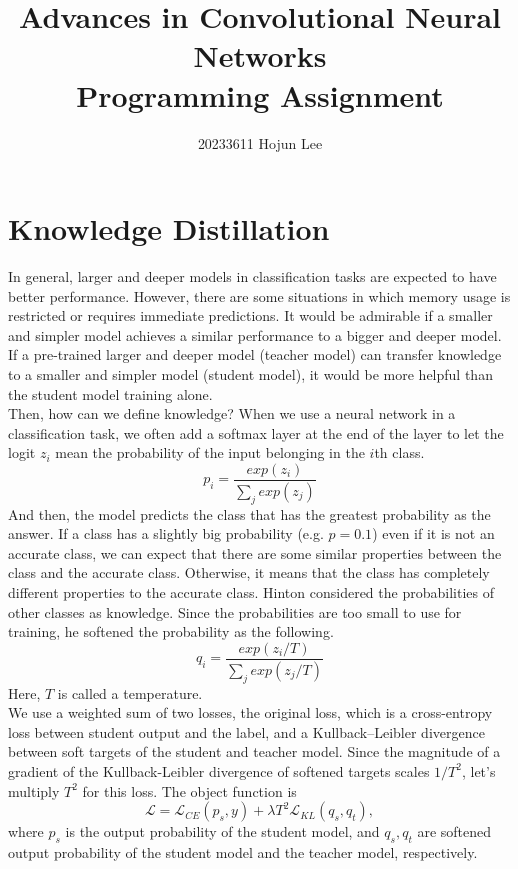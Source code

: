 \documentclass{article}
\title{Advances in Convolutional Neural Networks\\Programming Assignment}
\author{20233611 Hojun Lee}
\begin{document}
\maketitle

\section{Knowledge Distillation}
In general, larger and deeper models in classification tasks are expected to have better performance. However, there are some situations in which memory usage is restricted or requires immediate predictions. It would be admirable if a smaller and simpler model achieves a similar performance to a bigger and deeper model. If a pre-trained larger and deeper model (teacher model) can transfer knowledge to a smaller and simpler model (student model), it would be more helpful than the student model training alone.\\

Then, how can we define knowledge? When we use a neural network in a classification task, we often add a softmax layer at the end of the layer to let the logit $z_i$ mean the probability of the input belonging in the $i$th class.
\begin{equation}
    p_i=\frac{exp(z_i)}{\sum\limits_jexp(z_j)}
\end{equation}
And then, the model predicts the class that has the greatest probability as the answer. If a class has a slightly big probability (e.g. $p=0.1$) even if it is not an accurate class, we can expect that there are some similar properties between the class and the accurate class. Otherwise, it means that the class has completely different properties to the accurate class. Hinton considered the probabilities of other classes as knowledge. \cite{hinton2015distilling} Since the probabilities are too small to use for training, he softened the probability as the following.
\begin{equation}
    q_i=\frac{exp(z_i/T)}{\sum\limits_jexp(z_j/T)}
\end{equation}
Here, $T$ is called a temperature.\\

We use a weighted sum of two losses, the original loss, which is a cross-entropy loss between student output and the label, and a Kullback–Leibler divergence between soft targets of the student and teacher model. Since the magnitude of a gradient of the Kullback-Leibler divergence of softened targets scales $1/T^2$, let's multiply $T^2$ for this loss. The object function is 
\begin{equation}
    \mathcal{L}=\mathcal{L}_{CE}(p_s,y)+\lambda T^2\mathcal{L}_{KL}(q_s,q_t),
\end{equation}
where $p_s$ is the output probability of the student model, and $q_s,q_t$ are softened output probability of the student model and the teacher model, respectively.
\end{document}
